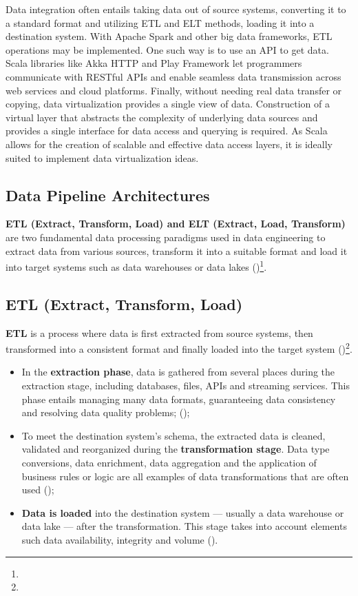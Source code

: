 Data integration often entails taking data out of source systems, converting it to a standard format and utilizing ETL and ELT methods, loading it into a destination system. With Apache Spark and other big data frameworks, ETL operations may be implemented. One such way is to use an API to get data. Scala libraries like Akka HTTP and Play Framework let programmers communicate with RESTful APIs and enable seamless data transmission across web services and cloud platforms. Finally, without needing real data transfer or copying, data virtualization provides a single view of data. Construction of a virtual layer that abstracts the complexity of underlying data sources and provides a single interface for data access and querying is required. As Scala allows for the creation of scalable and effective data access layers, it is ideally suited to implement data virtualization ideas.

\subsection{Data Pipeline Architectures}

\textbf{ETL (Extract, Transform, Load) and ELT (Extract, Load, Transform)} are two fundamental data processing paradigms used in data engineering to extract data from various sources, transform it into a suitable format and load it into target systems such as data warehouses or data lakes (\cite{etleltDatacamp})\footnote[22]{}.



\subsection{ETL (Extract, Transform, Load)}
\textbf{ETL} is a process where data is first extracted from source systems, then transformed into a consistent format and finally loaded into the target system (\cite{etleltDatacamp})\footnote[22]{}.

\begin{itemize}
    \item In the \textbf{extraction phase}, data is gathered from several places during the extraction stage, including databases, files, APIs and streaming services. This phase entails managing many data formats, guaranteeing data consistency and resolving data quality problems; (\cite{etleltDatacamp})\footnotemark[22];
    \item To meet the destination system's schema, the extracted data is cleaned, validated and reorganized during the \textbf{transformation stage}. Data type conversions, data enrichment, data aggregation and the application of business rules or logic are all examples of data transformations that are often used (\cite{etleltDatacamp})\footnotemark[22];
    \item \textbf{Data is loaded} into the destination system — usually a data warehouse or data lake — after the transformation. This stage takes into account elements such data availability, integrity and volume (\cite{etleltDatacamp})\footnotemark[22].
\end{itemize}

